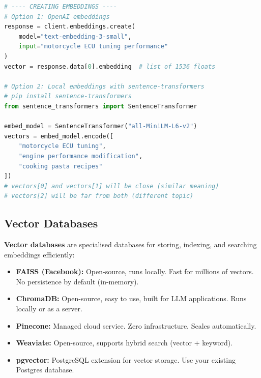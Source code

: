 \documentclass[12pt, a4paper, oneside]{book}
\begin{document}
\begin{lstlisting}[language=Python, caption={Creating embeddings and using vector search}]
# ---- CREATING EMBEDDINGS ----
# Option 1: OpenAI embeddings
response = client.embeddings.create(
    model="text-embedding-3-small",
    input="motorcycle ECU tuning performance"
)
vector = response.data[0].embedding  # list of 1536 floats

# Option 2: Local embeddings with sentence-transformers
# pip install sentence-transformers
from sentence_transformers import SentenceTransformer

embed_model = SentenceTransformer("all-MiniLM-L6-v2")
vectors = embed_model.encode([
    "motorcycle ECU tuning",
    "engine performance modification",
    "cooking pasta recipes"
])
# vectors[0] and vectors[1] will be close (similar meaning)
# vectors[2] will be far from both (different topic)
\end{lstlisting}

\subsection{Vector Databases}

\textbf{Vector databases} are specialised databases for storing, indexing, and searching embeddings efficiently:

\begin{itemize}[leftmargin=2em]
    \item \textbf{FAISS (Facebook):} Open-source, runs locally. Fast for millions of vectors. No persistence by default (in-memory).
    \item \textbf{ChromaDB:} Open-source, easy to use, built for LLM applications. Runs locally or as a server.
    \item \textbf{Pinecone:} Managed cloud service. Zero infrastructure. Scales automatically.
    \item \textbf{Weaviate:} Open-source, supports hybrid search (vector + keyword).
    \item \textbf{pgvector:} PostgreSQL extension for vector storage. Use your existing Postgres database.
\end{itemize}
\end{document}
